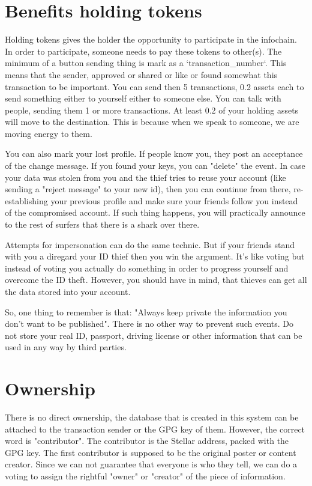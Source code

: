 \documentclass[10pt,a4paper,twocolumn]{paper}
\begin{document}
	\section{Benefits holding tokens}
	Holding tokens gives the holder the opportunity to participate in the infochain. In order to participate, someone needs to pay these tokens to other(s). The minimum of a button sending thing is mark as a `transaction\_number`. This means that the sender, approved or shared or like or found somewhat this transaction to be important. You can send then 5 transactions, 0.2 assets each to send something either to yourself either to someone else. You can talk with people, sending them 1 or more transactions. At least 0.2 of your holding assets will move to the destination. This is because when we speak to someone, we are moving energy to them.

	You can also mark your lost profile. If people know you, they post an acceptance of the change message. If you found your keys, you can "delete" the event. In case your data was stolen from you and the thief tries to reuse your account (like sending a "reject message" to your new id), then you can continue from there, re-establishing your previous profile and make sure your friends follow you instead of the compromised account. If such thing happens, you will practically announce to the rest of surfers that there is a shark over there.

	Attempts for impersonation can do the same technic. But if your friends stand with you a diregard your ID thief then you win the argument. It's like voting but instead of voting you actually do something in order to progress yourself and overcome the ID theft. However, you should have in mind, that thieves can get all the data stored into your account.
	
	So, one thing to remember is that: "Always keep private the information you don't want to be published". There is no other way to prevent such events. Do not store your real ID, passport, driving license or other information that can be used in any way by third parties.
	
	\section{Ownership}\label{ownership}
	
	There is no direct ownership, the database that is created in this system can be attached to the transaction sender or the GPG key of them. However, the correct word is "contributor". The contributor is the Stellar address, packed with the GPG key. The first contributor is supposed to be the original poster or content creator. Since we can not guarantee that everyone is who they tell, we can do a voting to assign the rightful "owner" or "creator" of the piece of information.
	
\end{document}

